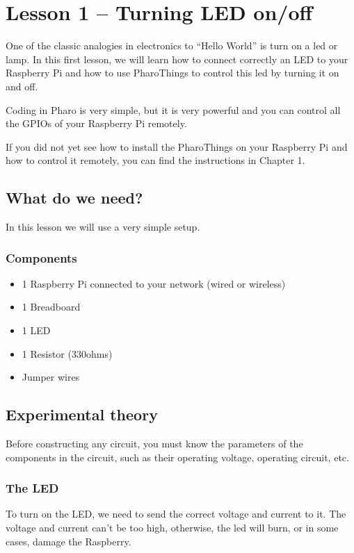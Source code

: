 \documentclass[10pt,twoside,english]{_support/latex/sbabook/sbabook}
\begin{document}
\frontmatter
\pagestyle{plain}

\tableofcontents*
\clearpage\listoffigures

\mainmatter

\chapter{Lesson 1 – Turning LED on/off}
One of the classic analogies in electronics to “Hello World” is turn on a led or lamp. In this first lesson, we will learn how to connect correctly an LED to your Raspberry Pi and how to use PharoThings to control this led by turning it on and off.

Coding in Pharo is very simple, but it is very powerful and you can control all the GPIOs of your Raspberry Pi remotely.

If you did not yet see how to install the PharoThings on your Raspberry Pi and how to control it remotely, you can find the instructions in Chapter 1.
\section{What do we need?}
In this lesson we will use a very simple setup.
\subsection{Components}
\begin{itemize}
\item 1 Raspberry Pi connected to your network (wired or wireless)
\item 1 Breadboard
\item 1 LED
\item 1 Resistor (330ohms)
\item Jumper wires
\end{itemize}
\section{Experimental theory}
Before constructing any circuit, you must know the parameters of the components in the circuit, such as their operating voltage, operating circuit, etc.
\subsection{The LED}
To turn on the LED, we need to send the correct voltage and current to it. The voltage and current can’t be too high, otherwise, the led will burn, or in some cases, damage the Raspberry.
\end{document}
